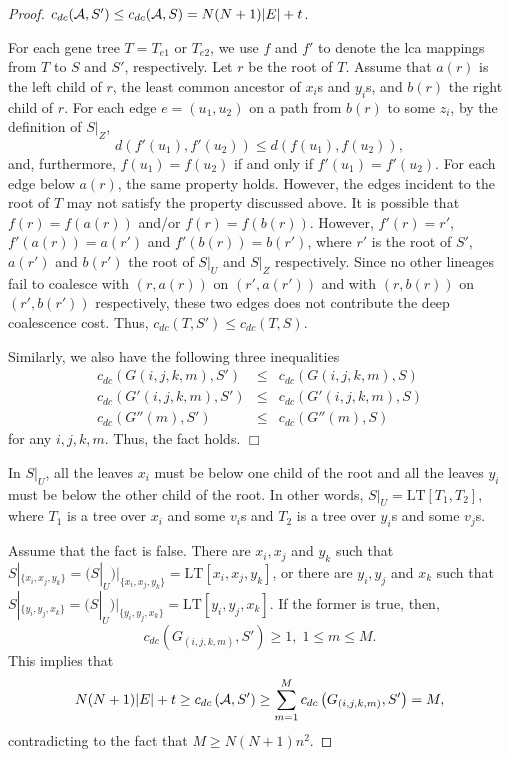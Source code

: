 \documentclass[9.5pt,journal,letterpaper,compsoc]{IEEEtran}
\begin{document}
\begin{proof}
  $c_{dc}({\cal A}, S') \leq c_{dc}({\cal A}, S)=N(N+1)|E| + t$.

 For each gene tree $T=T_{e1}$ or $T_{e2}$, we
use $f$ and $f'$ to denote the lca  mappings from $T$ to $S$ and
$S'$, respectively. Let $r$ be the root of $T$. Assume that $a(r)$
is the left child of $r$,  the least common ancestor of $x_i$s and
$y_i$s,  and $b(r)$  the right child of $r$.
  For each edge $e=(u_1, u_2)$ on a path from $b(r)$ to some $z_i$,
by the definition of $S|_{Z}$,
$$d(f'(u_1), f'(u_2)) \leq d(f(u_1),
f(u_2)),$$ and, furthermore,
 $f(u_1)=f(u_2)$ if and only if
$f'(u_1)=f'(u_2)$.
 For each edge below $a(r)$,
the same property holds. However, the edges incident to the root of
$T$ may not satisfy the property discussed above. It is possible
that $f(r)=f(a(r))$ and/or $f(r)=f(b(r))$. However, $f'(r)=r'$,
$f'(a(r))=a(r')$ and $f'(b(r))=b(r')$, where $r'$ is the root of
$S'$, $a(r')$ and $b(r')$
 the root of $S|_{U}$ and $S|_{Z}$ respectively.
 Since no other lineages fail to coalesce with
$(r, a(r))$  on $(r', a(r'))$ and with $(r, b(r))$ on
 $(r', b(r'))$ respectively, these two edges
does not contribute the deep coalescence cost. Thus,  $c_{dc}(T,
S')\leq c_{dc}(T, S)$.

  Similarly, we also have the following three inequalities
  \begin{eqnarray*}
    c_{dc}\left(G(i, j, k, m), S'\right) &\leq&  c_{dc}\left(G(i, j, k, m), S\right)\\
    c_{dc}\left(G'(i, j, k, m), S'\right) &\leq & c_{dc}\left(G'(i, j, k, m), S\right)\\
c_{dc}\left(G''(m), S'\right) &\leq&  c_{dc}\left(G''(m), S\right)
\end{eqnarray*}
for any $i, j, k, m$.
 Thus, the fact holds. $\Box$
\vspace{0.5em}


  In  $S|_{U}$,
   all the leaves $x_i$ must be below one child of
 the root and all the leaves $y_i$ must be below the other child of the root.
 In other words, $S|_{U}=\mbox{LT}[T_1, T_2]$, where
 $T_1$ is a tree over $x_i$ and some $v_i$s and $T_2$ is a tree over $y_i$s and
some $v_j$s.

Assume that  the fact is false. There are $x_i, x_j$ and $y_k$ such that
 $S|_{\{x_i, x_j, y_k\}}= (S|_{U})|_{\{x_i, x_j, y_k\}}= \mbox{LT}[x_i,
x_j, y_k]$, or there are $y_i, y_j$ and $x_k$ such that $S|_{\{y_i,
y_j, x_k\}}= (S|_{U})|_{\{y_i, y_j, x_k\}}= \mbox{LT}[y_i,
y_j, x_k]$. If the former is true, then, %
 $$c_{dc}\left(G_{(i, j, k, m)}, S'\right) \geq 1, \;1\leq m\leq M.$$
This implies that
$$N(N+1)|E|+t\geq  c_{dc}\left({\cal A}, S'\right) \geq \sum^{M}_{m=1}
c_{dc}\left(G_{(i, j, k, m)}, S'\right)  = M,$$
  contradicting to the fact that  $M\geq N(N+1)n^2$.


\end{proof}
\end{document}
